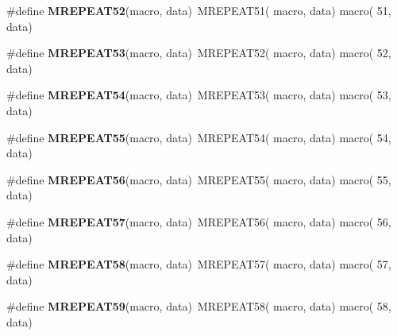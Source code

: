 \begin{DoxyCompactItemize}
\item 
\hypertarget{group__group__sam0__utils__mrepeat_ga321d36cd49e5f6ca5dc7066e7913e634}{}\#define {\bfseries M\+R\+E\+P\+E\+A\+T52}(macro,  data)~M\+R\+E\+P\+E\+A\+T51( macro, data)   macro( 51, data)\label{group__group__sam0__utils__mrepeat_ga321d36cd49e5f6ca5dc7066e7913e634}

\item 
\hypertarget{group__group__sam0__utils__mrepeat_ga89d961bc06d5e1e4f531ee43424c0e98}{}\#define {\bfseries M\+R\+E\+P\+E\+A\+T53}(macro,  data)~M\+R\+E\+P\+E\+A\+T52( macro, data)   macro( 52, data)\label{group__group__sam0__utils__mrepeat_ga89d961bc06d5e1e4f531ee43424c0e98}

\item 
\hypertarget{group__group__sam0__utils__mrepeat_ga04d38cb9d863bba593db5c5533234b2b}{}\#define {\bfseries M\+R\+E\+P\+E\+A\+T54}(macro,  data)~M\+R\+E\+P\+E\+A\+T53( macro, data)   macro( 53, data)\label{group__group__sam0__utils__mrepeat_ga04d38cb9d863bba593db5c5533234b2b}

\item 
\hypertarget{group__group__sam0__utils__mrepeat_ga43d357d7b292b560fb1a49f4778f56e8}{}\#define {\bfseries M\+R\+E\+P\+E\+A\+T55}(macro,  data)~M\+R\+E\+P\+E\+A\+T54( macro, data)   macro( 54, data)\label{group__group__sam0__utils__mrepeat_ga43d357d7b292b560fb1a49f4778f56e8}

\item 
\hypertarget{group__group__sam0__utils__mrepeat_ga1f3c1ef60a18b07755f237d441952d34}{}\#define {\bfseries M\+R\+E\+P\+E\+A\+T56}(macro,  data)~M\+R\+E\+P\+E\+A\+T55( macro, data)   macro( 55, data)\label{group__group__sam0__utils__mrepeat_ga1f3c1ef60a18b07755f237d441952d34}

\item 
\hypertarget{group__group__sam0__utils__mrepeat_ga6c79341e638712e4f76cfa03b92acba3}{}\#define {\bfseries M\+R\+E\+P\+E\+A\+T57}(macro,  data)~M\+R\+E\+P\+E\+A\+T56( macro, data)   macro( 56, data)\label{group__group__sam0__utils__mrepeat_ga6c79341e638712e4f76cfa03b92acba3}

\item 
\hypertarget{group__group__sam0__utils__mrepeat_ga36b3ee8ed153de1e332867165d8bd129}{}\#define {\bfseries M\+R\+E\+P\+E\+A\+T58}(macro,  data)~M\+R\+E\+P\+E\+A\+T57( macro, data)   macro( 57, data)\label{group__group__sam0__utils__mrepeat_ga36b3ee8ed153de1e332867165d8bd129}

\item 
\hypertarget{group__group__sam0__utils__mrepeat_ga0cdad412352b83b391e04d59bc7302b5}{}\#define {\bfseries M\+R\+E\+P\+E\+A\+T59}(macro,  data)~M\+R\+E\+P\+E\+A\+T58( macro, data)   macro( 58, data)\label{group__group__sam0__utils__mrepeat_ga0cdad412352b83b391e04d59bc7302b5}


\end{DoxyCompactItemize}

